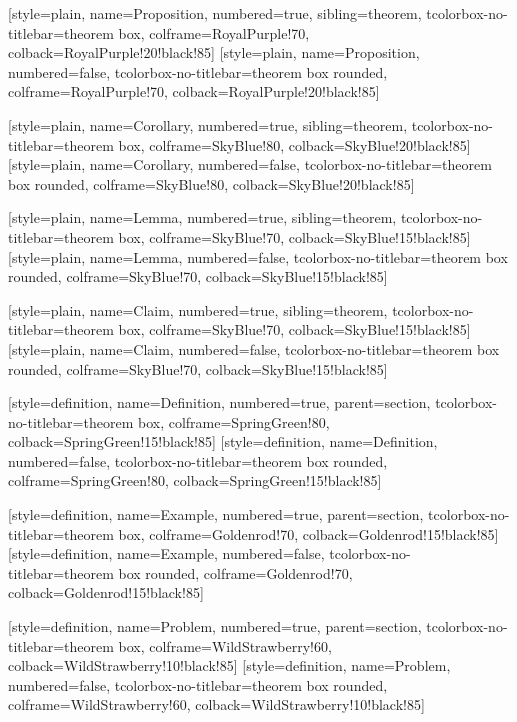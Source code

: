 [style=plain, name=Proposition, numbered=true, sibling=theorem,
    tcolorbox-no-titlebar={theorem box, colframe=RoyalPurple!70, colback=RoyalPurple!20!black!85}]
[style=plain, name=Proposition, numbered=false,
    tcolorbox-no-titlebar={theorem box rounded, colframe=RoyalPurple!70, colback=RoyalPurple!20!black!85}]

[style=plain, name=Corollary, numbered=true, sibling=theorem,
    tcolorbox-no-titlebar={theorem box, colframe=SkyBlue!80, colback=SkyBlue!20!black!85}]
[style=plain, name=Corollary, numbered=false,
    tcolorbox-no-titlebar={theorem box rounded, colframe=SkyBlue!80, colback=SkyBlue!20!black!85}]

[style=plain, name=Lemma, numbered=true, sibling=theorem,
    tcolorbox-no-titlebar={theorem box, colframe=SkyBlue!70, colback=SkyBlue!15!black!85}]
[style=plain, name=Lemma, numbered=false,
    tcolorbox-no-titlebar={theorem box rounded, colframe=SkyBlue!70, colback=SkyBlue!15!black!85}]

[style=plain, name=Claim, numbered=true, sibling=theorem,
    tcolorbox-no-titlebar={theorem box, colframe=SkyBlue!70, colback=SkyBlue!15!black!85}]
[style=plain, name=Claim, numbered=false,
    tcolorbox-no-titlebar={theorem box rounded, colframe=SkyBlue!70, colback=SkyBlue!15!black!85}]

[style=definition, name=Definition, numbered=true, parent=section,
    tcolorbox-no-titlebar={theorem box, colframe=SpringGreen!80, colback=SpringGreen!15!black!85}]
[style=definition, name=Definition, numbered=false,
    tcolorbox-no-titlebar={theorem box rounded, colframe=SpringGreen!80, colback=SpringGreen!15!black!85}]

[style=definition, name=Example, numbered=true, parent=section,
    tcolorbox-no-titlebar={theorem box, colframe=Goldenrod!70, colback=Goldenrod!15!black!85}]
[style=definition, name=Example, numbered=false,
    tcolorbox-no-titlebar={theorem box rounded, colframe=Goldenrod!70, colback=Goldenrod!15!black!85}]

[style=definition, name=Problem, numbered=true, parent=section,
    tcolorbox-no-titlebar={theorem box, colframe=WildStrawberry!60, colback=WildStrawberry!10!black!85}]
[style=definition, name=Problem, numbered=false,
    tcolorbox-no-titlebar={theorem box rounded, colframe=WildStrawberry!60, colback=WildStrawberry!10!black!85}]

